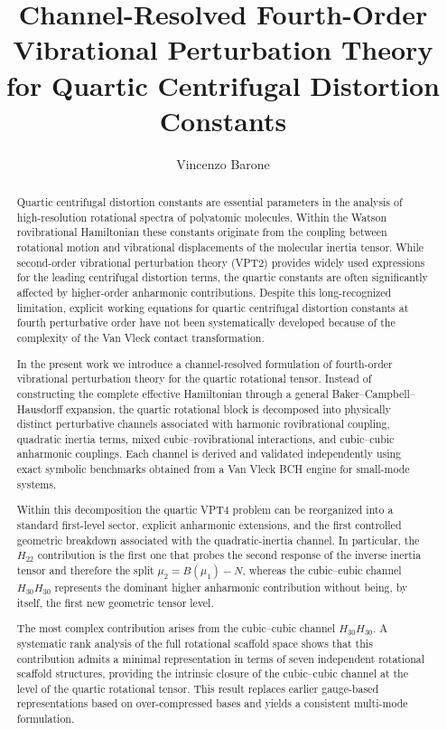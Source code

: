 \documentclass[aip,jcp,reprint]{revtex4-2}
\begin{document}
\title{Channel-Resolved Fourth-Order Vibrational Perturbation Theory for Quartic Centrifugal Distortion Constants}

\author{Vincenzo Barone}

\begin{abstract}

Quartic centrifugal distortion constants are essential parameters in the
analysis of high-resolution rotational spectra of polyatomic molecules.
Within the Watson rovibrational Hamiltonian these constants originate from
the coupling between rotational motion and vibrational displacements of
the molecular inertia tensor. While second-order vibrational perturbation
theory (VPT2) provides widely used expressions for the leading centrifugal
distortion terms, the quartic constants are often significantly affected
by higher-order anharmonic contributions. Despite this long-recognized
limitation, explicit working equations for quartic centrifugal distortion
constants at fourth perturbative order have not been systematically
developed because of the complexity of the Van Vleck contact transformation.

In the present work we introduce a channel-resolved formulation of
fourth-order vibrational perturbation theory for the quartic rotational
tensor. Instead of constructing the complete effective Hamiltonian through
a general Baker--Campbell--Hausdorff expansion, the quartic rotational block
is decomposed into physically distinct perturbative channels associated with
harmonic rovibrational coupling, quadratic inertia terms, mixed
cubic--rovibrational interactions, and cubic--cubic anharmonic couplings.
Each channel is derived and validated independently using exact symbolic
benchmarks obtained from a Van Vleck BCH engine for small-mode systems.

Within this decomposition the quartic VPT4 problem can be reorganized into
a standard first-level sector, explicit anharmonic extensions, and the first
controlled geometric breakdown associated with the quadratic-inertia channel.
In particular, the $H_{22}$ contribution is the first one that probes the
second response of the inverse inertia tensor and therefore the split
$\mu_2 = B(\mu_1) - N$, whereas the cubic--cubic channel $H_{30}H_{30}$
represents the dominant higher anharmonic contribution without being, by
itself, the first new geometric tensor level.

The most complex contribution arises from the cubic--cubic channel
$H_{30}H_{30}$. A systematic rank analysis of the full rotational scaffold
space shows that this contribution admits a minimal representation in terms
of seven independent rotational scaffold structures, providing the intrinsic
closure of the cubic--cubic channel at the level of the quartic rotational
tensor. This result replaces earlier gauge-based representations based on
over-compressed bases and yields a consistent multi-mode formulation.


\end{abstract}
\end{document}
